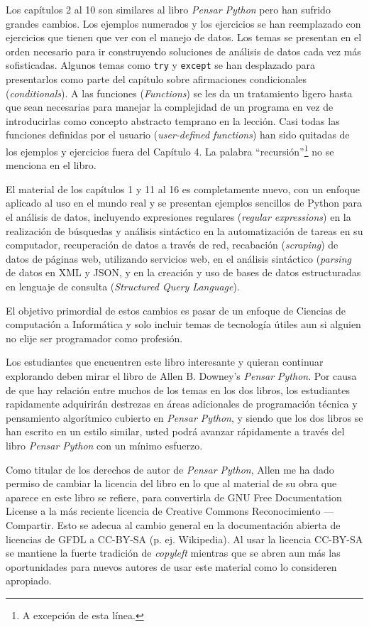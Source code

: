 Los cap\'itulos 2 al 10 son similares al libro \emph{Pensar Python}
pero han sufrido grandes cambios. Los ejemplos numerados y los ejercicios se han reemplazado con ejercicios que tienen que ver con el manejo de datos. Los temas se presentan en el orden necesario para ir construyendo soluciones de an\'alisis de datos cada vez m\'as sofisticadas. Algunos temas como {\tt try} y
{\tt except} se han desplazado para presentarlos como parte del cap\'itulo sobre afirmaciones condicionales (\textit{conditionals}). A las funciones (\textit{Functions}) se les da un tratamiento ligero hasta que sean necesarias para manejar la complejidad de un programa en vez de introducirlas como concepto abstracto temprano en la lecci\'on. Casi todas las funciones definidas por el usuario (\textit{user-defined functions}) han sido quitadas de los ejemplos y ejercicios fuera del Cap\'itulo 4. La palabra ``recursi\'on''\footnote{A excepci\'on de esta l\'inea.} no se menciona en el libro.

El material de los cap\'itulos 1 y 11 al 16 es completamente nuevo, con un enfoque aplicado al uso en el mundo real y se presentan ejemplos sencillos de Python para el an\'alisis de datos, incluyendo expresiones regulares (\textit{regular expressions}) en la realizaci\'on de b\'usquedas y an\'alisis sint\'actico en la automatizaci\'on de tareas en su computador, recuperaci\'on de datos a trav\'es de red, recabaci\'on (\textit{scraping}) de datos de p\'aginas web, utilizando servicios web, en el an\'alisis sint\'actico (\textit{parsing} de datos en XML y JSON, y en la creaci\'on y uso de bases de datos estructuradas en lenguaje de consulta (\textit{Structured Query Language}).

El objetivo primordial de estos cambios es pasar de un enfoque de Ciencias de computaci\'on a Inform\'atica y solo incluir temas de tecnolog\'ia \'utiles aun si alguien no elije ser programador como profesi\'on.

Los estudiantes que encuentren este libro interesante y quieran continuar explorando deben mirar el libro de Allen B. Downey's \emph{Pensar Python}. Por causa de que hay relaci\'on entre muchos de los temas en los dos libros,
los estudiantes rapidamente adquirir\'an destrezas en \'areas adicionales de programaci\'on t\'ecnica y pensamiento algor\'itmico cubierto en \emph{Pensar Python}, y siendo que los dos libros se han escrito en un estilo similar, usted podr\'a avanzar r\'apidamente a trav\'es del libro \emph{Pensar Python} con un m\'inimo esfuerzo.

Como titular de los derechos de autor de \emph{Pensar Python},
Allen me ha dado permiso de cambiar la licencia del libro en lo que al material de su obra que aparece en este libro se refiere, para convertirla de GNU Free Documentation License 
a la m\'as reciente licencia de Creative Commons Reconocimiento --- Compartir. Esto se adecua al cambio general en la documentaci\'on abierta de licencias de GFDL a CC-BY-SA (p. ej. Wikipedia).
Al usar la licencia CC-BY-SA se mantiene la fuerte tradici\'on de \textit{copyleft} mientras  que se abren aun m\'as las oportunidades para nuevos autores de usar este material como lo consideren apropiado.

